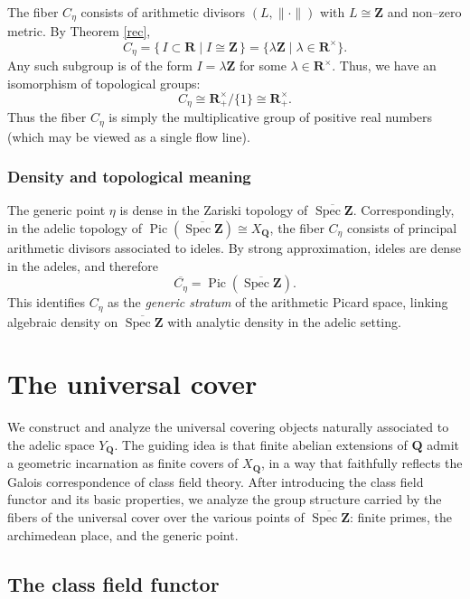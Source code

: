 \documentclass[11pt,a4paper]{article}
\newcommand{\Q}{\mathbf{Q}}
\newcommand{\Z}{\mathbf{Z}}
\newcommand{\R}{\mathbf{R}}
\def\spzb{\overline{\Spec \Z}}
\newcommand{\Spec}{\operatorname{Spec}}
\def\Pic{\operatorname{Pic}}
\theoremstyle{plain}
\theoremstyle{definition} %
\begin{document}
The fiber $C_\eta$ consists of arithmetic divisors $(L,\|\cdot\|)$ with
$L \cong \Z$ and non--zero metric.  By  Theorem \ref{rec},
\[
C_\eta = \{\, I \subset \R \mid I \cong \Z \,\} = \{ \lambda \Z \mid \lambda \in \R^\times \}.
\]
Any such subgroup is of the form $I = \lambda \Z$ for some $\lambda \in \R^\times$.
Thus, we have an isomorphism of topological groups:
\[
C_\eta \cong \R_+^\times / \{1\} \cong \R_+^\times.
\]
Thus the fiber $C_\eta$ is simply the multiplicative group of positive real numbers (which may be viewed as a single flow line).



\subsubsection{Density and topological meaning}

The generic point $\eta$ is dense in the Zariski topology of $\spzb$.
Correspondingly, in the adelic topology of $\Pic(\spzb) \cong X_\Q$, the fiber
$C_\eta$ consists of principal arithmetic divisors associated to ideles.
By strong approximation, ideles are dense in the adeles, and therefore
\[
\overline{C_\eta} = \Pic(\spzb) .
\]
This identifies $C_\eta$ as the \emph{generic stratum} of the arithmetic Picard space,
linking algebraic density on $\spzb$ with analytic density in the adelic setting.






\section{The universal cover}\label{sectuniv}


We construct and analyze the universal covering objects naturally
associated to the adelic space $Y_\Q$.  The guiding idea is that finite abelian extensions
of $\Q$ admit a geometric incarnation as finite covers of $X_\Q$, in a way that
faithfully reflects the Galois correspondence of class field theory.
After introducing the class field functor and its basic properties, we analyze
the group structure carried by the fibers of the universal cover over the various
points of $\spzb$: finite primes, the archimedean place, and the generic point.


\subsection{The class field functor}\label{sectcft}
\end{document}
